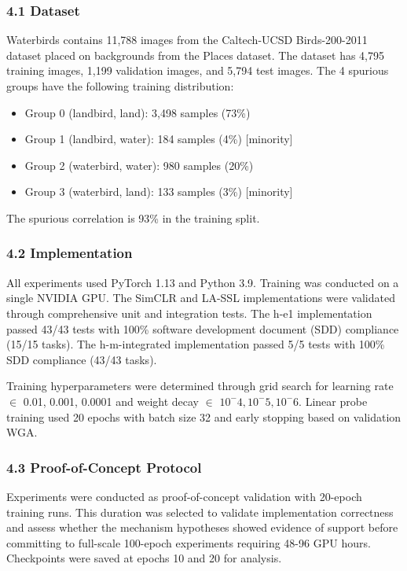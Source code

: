 
\subsubsection{4.1 Dataset}

Waterbirds \citep{sagawa2020groupdro} contains 11,788 images from the Caltech-UCSD Birds-200-2011 dataset placed on backgrounds from the Places dataset. The dataset has 4,795 training images, 1,199 validation images, and 5,794 test images. The 4 spurious groups have the following training distribution:

\begin{itemize}
\item Group 0 (landbird, land): 3,498 samples (73\%)
\item Group 1 (landbird, water): 184 samples (4\%) [minority]
\item Group 2 (waterbird, water): 980 samples (20\%)
\item Group 3 (waterbird, land): 133 samples (3\%) [minority]
\end{itemize}

The spurious correlation is 93\% in the training split.

\subsubsection{4.2 Implementation}

All experiments used PyTorch 1.13 and Python 3.9. Training was conducted on a single NVIDIA GPU. The SimCLR and LA-SSL implementations were validated through comprehensive unit and integration tests. The h-e1 implementation passed 43/43 tests with 100\% software development document (SDD) compliance (15/15 tasks). The h-m-integrated implementation passed 5/5 tests with 100\% SDD compliance (43/43 tasks).

Training hyperparameters were determined through grid search for learning rate $\in$ {0.01, 0.001, 0.0001} and weight decay $\in$ {$10^-4, 10^-5, 10^-6$}. Linear probe training used 20 epochs with batch size 32 and early stopping based on validation WGA.

\subsubsection{4.3 Proof-of-Concept Protocol}

Experiments were conducted as proof-of-concept validation with 20-epoch training runs. This duration was selected to validate implementation correctness and assess whether the mechanism hypotheses showed evidence of support before committing to full-scale 100-epoch experiments requiring 48-96 GPU hours. Checkpoints were saved at epochs 10 and 20 for analysis.
